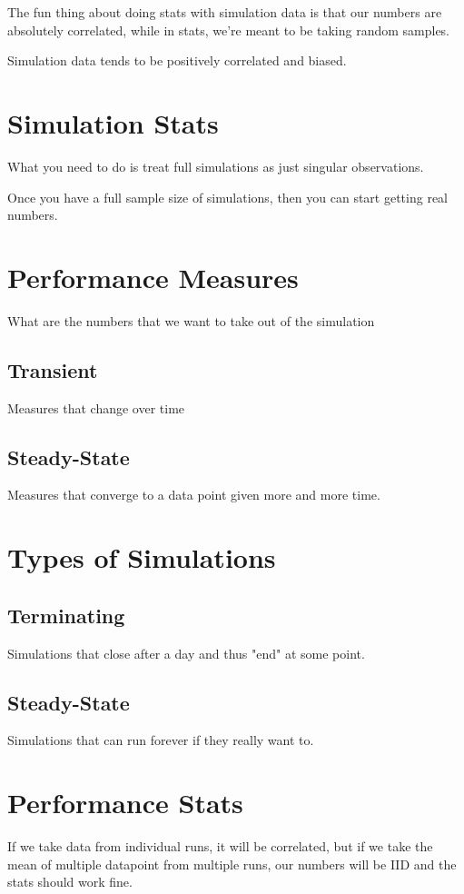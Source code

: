 \documentclass[fleqn]{report}
\begin{document}
The fun thing about doing stats with simulation data is that our numbers are 
absolutely correlated, while in stats, we're meant to be taking random samples. 

Simulation data tends to be positively correlated and biased. 
    
\section{Simulation Stats}
What you need to do is treat full simulations as just singular observations. 

Once you have a full sample size of simulations, then you can start getting 
real numbers. 

\section{Performance Measures}
What are the numbers that we want to take out of the simulation 

\subsection{Transient}
Measures that change over time 

\subsection{Steady-State}
Measures that converge to a data point given more and more time. 

\section{Types of Simulations}

\subsection{Terminating}
Simulations that close after a day and thus "end" at some point. 

\subsection{Steady-State}
Simulations that can run forever if they really want to. 

\section{Performance Stats}
If we take data from individual runs, it will be correlated, but if we take 
the mean of multiple datapoint from multiple runs, our numbers will be IID 
and the stats should work fine. 
\end{document}
